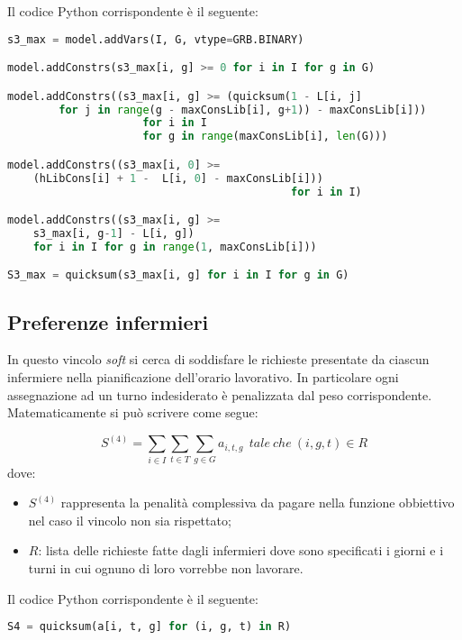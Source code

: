 Il codice Python corrispondente è il seguente:
\begin{lstlisting}[language=Python]
s3_max = model.addVars(I, G, vtype=GRB.BINARY)

model.addConstrs(s3_max[i, g] >= 0 for i in I for g in G)

model.addConstrs((s3_max[i, g] >= (quicksum(1 - L[i, j] 
		for j in range(g - maxConsLib[i], g+1)) - maxConsLib[i]))
                     for i in I
                     for g in range(maxConsLib[i], len(G)))

model.addConstrs((s3_max[i, 0] >= 
	(hLibCons[i] + 1 - 	L[i, 0] - maxConsLib[i]))
                                 			for i in I)

model.addConstrs((s3_max[i, g] >= 
	s3_max[i, g-1] - L[i, g])
    for i in I for g in range(1, maxConsLib[i]))

S3_max = quicksum(s3_max[i, g] for i in I for g in G)
\end{lstlisting}


\subsection{Preferenze infermieri}
In questo vincolo \textit{soft} si cerca di soddisfare le richieste presentate da ciascun infermiere nella pianificazione dell'orario lavorativo. In particolare ogni assegnazione ad un turno indesiderato è penalizzata dal peso corrispondente.
Matematicamente si può scrivere come segue:

\begin{equation}
S^{(4)} = \sum_{i \in I} \sum_{t \in T} \sum_{g \in G} a_{i, t, g} ~~ tale ~ che ~ (i, g, t) \in R
\end{equation}
dove:
\begin{itemize}
\item $S^{(4)}$ rappresenta la penalità complessiva da pagare nella funzione obbiettivo nel caso il vincolo non sia rispettato;
\item $R$: lista delle richieste fatte dagli infermieri dove sono specificati i giorni e i turni in cui ognuno di loro vorrebbe non lavorare.
\end{itemize}

Il codice Python corrispondente è il seguente:
\begin{lstlisting}[language=Python]
S4 = quicksum(a[i, t, g] for (i, g, t) in R)
\end{lstlisting}

